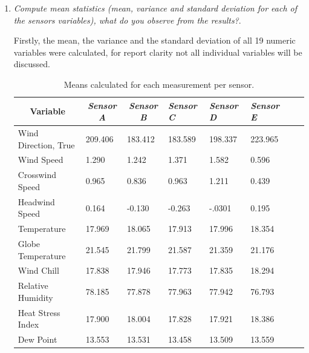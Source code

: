 \documentclass[a4paper,12pt]{article} %
\begin{document}
\begin{enumerate}

\item {\it Compute mean statistics (mean, variance and standard deviation for each of the sensors variables), what do you observe from the results?}. %

Firstly, the mean, the variance and the standard deviation of all 19 numeric variables were calculated, for report clarity not all individual variables will be discussed. 


\begin{table}[H]
\centering
\caption{Means calculated for each measurement per sensor.}
\begin{tabular}{llllllll}
\multicolumn{1}{c}{\textbf{Variable}} & \multicolumn{1}{c}{\textit{Sensor A}} & \multicolumn{1}{c}{\textit{Sensor B}} & \textit{Sensor C} & \textit{Sensor D} & \textit{Sensor E}  \\ \hline
Wind Direction, True                  & 209.406               & 183.412               & 183.589             & 198.337            & 223.965 \\
Wind Speed             & 1.290                                 &1.242                     & 1.371             & 1.582            & 0.596 \\
Crosswind Speed             &0.965          &0.836                     & 0.963             & 1.211            & 0.439 \\
Headwind Speed             &0.164          &-0.130                     & -0.263             & -.0301            & 0.195 \\
Temperature             &17.969          &18.065                     &17.913             &17.996            & 18.354 \\
Globe Temperature             &21.545          &21.799                     &21.587             &21.359            &21.176 \\
Wind Chill             &17.838          &17.946                     &17.773             &17.835            & 18.294 \\
Relative Humidity             &78.185          &77.878                     &77.963             &77.942            & 76.793 \\
Heat Stress Index             &17.900          &18.004                     &17.828             &17.921            & 18.386 \\
Dew Point             &13.553          &13.531                     &13.458             &13.509            & 13.559 \\

\end{tabular}
\end{table}
\end{enumerate}
\end{document}
